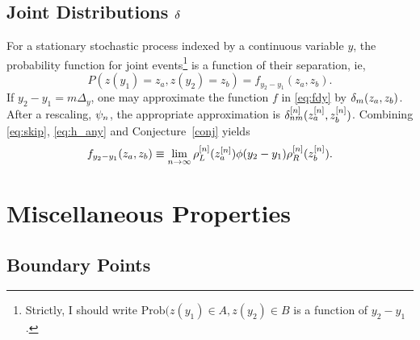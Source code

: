 \documentclass[twocolumn]{article}
\begin{document}
\subsection{Joint Distributions $\delta_{}$}
\label{sec:convergence_joint}

For a stationary stochastic process indexed by a continuous variable
$y$, the probability function for joint events\footnote{Strictly, I
  should write $\text{Prob}(z(y_1)\in A, z(y_2) \in B$ is a function
  of $y_2-y_1$.} is a function of their separation, ie,
\begin{equation}
  \label{eq:fdy}
  P(z(y_1)=z_a, z(y_2)=z_b) = f_{y_2-y_1}(z_a,z_b).
\end{equation}
If $y_2-y_1 = m\Delta_y$, one may approximate the function $f$ in
\eqref{eq:fdy} by $\delta_{m}(z_a,z_b)$.  After a rescaling,
$\psi_{n}$, the appropriate approximation is
$\delta_{nm}^{[n]}(z_a^{[n]},z_b^{[n]})$.  Combining \eqref{eq:skip},
\eqref{eq:h_any} and Conjecture~\ref{conj} yields
\begin{equation}
  \label{eq:flim}
  f_{y_2-y_1}(z_a,z_b) \equiv \lim_{n\rightarrow \infty}
  \rho_L^{[n]}(z_a^{[n]}) \phi(y_2-y_1) \rho_R^{[n]}(z_b^{[n]}).
\end{equation}

\section{Miscellaneous Properties}
\label{sec:properties}

\subsection{Boundary Points}
\label{sec:boundary}
\end{document}
